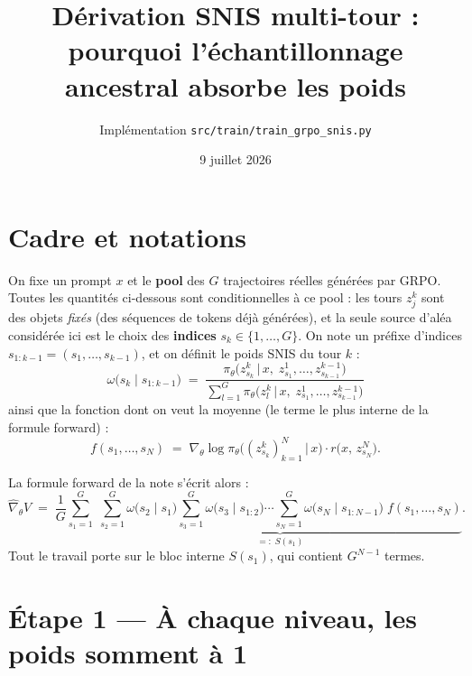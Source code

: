\documentclass{article}
\newcommand{\pref}[2]{s_{#1:#2}}                     %
\newcommand{\w}[2]{\omega\big(#1 \mid #2\big)}       %
\begin{document}
\title{Dérivation SNIS multi-tour :\\
pourquoi l'échantillonnage ancestral absorbe les poids}
\author{Implémentation \texttt{src/train/train\_grpo\_snis.py}}
\date{9 juillet 2026}
\maketitle

\section{Cadre et notations}

On fixe un prompt $x$ et le \textbf{pool} des $G$ trajectoires réelles générées par
GRPO. Toutes les quantités ci-dessous sont conditionnelles à ce pool : les tours
$z^k_j$ sont des objets \emph{fixés} (des séquences de tokens déjà générées), et la
seule source d'aléa considérée ici est le choix des \textbf{indices}
$s_k \in \{1,\dots,G\}$. On note un préfixe d'indices
$\pref{1}{k-1} = (s_1, \dots, s_{k-1})$, et on définit le poids SNIS du tour $k$ :
\begin{equation}
\w{s_k}{\pref{1}{k-1}}
\;=\;
\frac{\pi_\theta\big(z^{k}_{s_k} \,\big|\, x,\; z^1_{s_1}, \ldots, z^{k-1}_{s_{k-1}}\big)}
     {\displaystyle\sum_{l=1}^{G} \pi_\theta\big(z^{k}_{l} \,\big|\, x,\; z^1_{s_1}, \ldots, z^{k-1}_{s_{k-1}}\big)}
\label{eq:poids}
\end{equation}
ainsi que la fonction dont on veut la moyenne (le terme le plus interne de la
formule forward) :
\begin{equation}
f(s_1, \ldots, s_N)
\;=\;
\nabla_\theta \log \pi_\theta\big((z^k_{s_k})_{k=1}^{N} \,\big|\, x\big)
\cdot r\big(x,\, z^N_{s_N}\big).
\label{eq:f}
\end{equation}

La formule forward de la note s'écrit alors :
\begin{equation}
\hat{\nabla}_\theta V
\;=\;
\frac{1}{G} \sum_{s_1=1}^{G}\;
\underbrace{\sum_{s_2=1}^{G} \w{s_2}{s_1}
\sum_{s_3=1}^{G} \w{s_3}{\pref{1}{2}} \cdots
\sum_{s_N=1}^{G} \w{s_N}{\pref{1}{N-1}}\;
f(s_1, \ldots, s_N)}_{=:\;S(s_1)}.
\label{eq:forward}
\end{equation}
Tout le travail porte sur le bloc interne $S(s_1)$, qui contient $G^{N-1}$ termes.

\section{Étape 1 --- À chaque niveau, les poids somment à 1}
\end{document}
